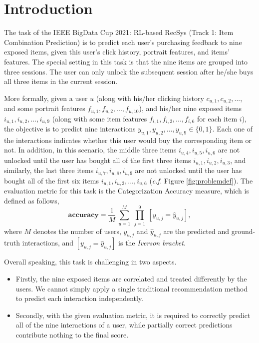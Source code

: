 

\section{Introduction} \label{sec:intro}



The task of the IEEE BigData Cup 2021: RL-based RecSys (Track 1: Item Combination Prediction) \cite{kaggle} is to predict each user's purchasing feedback to nine exposed items, given this user's click history, portrait features, and items' features.
The special setting in this task is that the nine items are grouped into three sessions. 
The user can only unlock the subsequent session after he/she buys all three items in the current session.

More formally, given a user $u$ (along with his/her clicking history $c_{u,1}, c_{u,2}, ...$, and some portrait features $f_{u,1}, f_{u,2}, ..., f_{u,10}$), and his/her nine exposed items $i_{u,1}, i_{u,2}, ..., i_{u,9}$ (along with some item features $f_{i,1}, f_{i,2}, ..., f_{i,6}$ for each item $i$), 
the objective is to predict nine interactions $y_{u,1}, y_{u,2}, ..., y_{u,9} \in \{0,1\}$.
Each one of the interactions indicates whether this user would buy the corresponding item or not. 
In addition, in this scenario, the middle three items $i_{u,4}, i_{u,5}, i_{u,6}$ are not unlocked until the user has bought all of the first three items $i_{u,1}, i_{u,2}, i_{u,3}$, and similarly, the last three items $i_{u,7}, i_{u,8}, i_{u,9}$ are not unlocked until the user has bought all of the first six items $i_{u,1}, i_{u,2}, ..., i_{u,6}$ (\textit{c.f.} Figure \ref{fig:problemdef}). 
The evaluation metric for this task is the Categorization Accuracy measure, which is defined as follows,
\begin{equation}
    \textbf{accuracy} = \frac{1}{M} 
    ~\overset{M}{\underset{u=1}{\sum}}  ~\overset{9}{\underset{j=1}{\prod}} 
    ~[y_{u,j} = \hat{y}_{u,j}],
\end{equation}
where $M$ denotes the number of users, $y_{u,j}$ and $\hat{y}_{u,j}$ are the predicted and ground-truth interactions, and $[y_{u,j} = \hat{y}_{u,j}]$ is the \textit{Iverson bracket}.

Overall speaking, this task is challenging in two aspects.
\begin{itemize}
    \item Firstly, the nine exposed items are correlated and treated differently by the users. We cannot simply apply a single traditional recommendation method to predict each interaction independently.
    \item Secondly, with the given evaluation metric, it is required to correctly predict all of the nine interactions of a user, while partially correct predictions contribute nothing to the final score.
\end{itemize}
%


